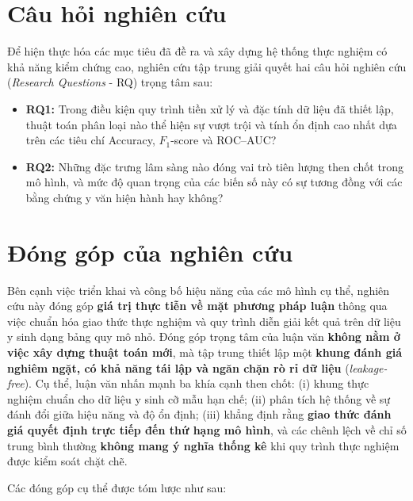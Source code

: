 \documentclass[14pt,a4paper]{extreport}
\begin{document}
\section{Câu hỏi nghiên cứu}

Để hiện thực hóa các mục tiêu đã đề ra và xây dựng hệ thống thực nghiệm có khả năng kiểm chứng cao, nghiên cứu tập trung giải quyết hai câu hỏi nghiên cứu (\textit{Research Questions} - RQ) trọng tâm sau:

\begin{itemize}
  \item \textbf{RQ1:} Trong điều kiện quy trình tiền xử lý và đặc tính dữ liệu đã thiết lập, thuật toán phân loại nào thể hiện sự vượt trội và tính ổn định cao nhất dựa trên các tiêu chí Accuracy, $F_1$-score và ROC--AUC?
  \item \textbf{RQ2:} Những đặc trưng lâm sàng nào đóng vai trò tiên lượng then chốt trong mô hình, và mức độ quan trọng của các biến số này có sự tương đồng với các bằng chứng y văn hiện hành hay không?
\end{itemize}


\section{Đóng góp của nghiên cứu}

Bên cạnh việc triển khai và công bố hiệu năng của các mô hình cụ thể, nghiên cứu này đóng góp \textbf{giá trị thực tiễn về mặt phương pháp luận} thông qua việc chuẩn hóa giao thức thực nghiệm và quy trình diễn giải kết quả trên dữ liệu y sinh dạng bảng quy mô nhỏ. Đóng góp trọng tâm của luận văn \textbf{không nằm ở việc xây dựng thuật toán mới}, mà tập trung thiết lập một \textbf{khung đánh giá nghiêm ngặt, có khả năng tái lập và ngăn chặn rò rỉ dữ liệu} (\textit{leakage-free}). Cụ thể, luận văn nhấn mạnh ba khía cạnh then chốt: (i) khung thực nghiệm chuẩn cho dữ liệu y sinh cỡ mẫu hạn chế; (ii) phân tích hệ thống về sự đánh đổi giữa hiệu năng và độ ổn định; (iii) khẳng định rằng \textbf{giao thức đánh giá quyết định trực tiếp đến thứ hạng mô hình}, và các chênh lệch về chỉ số trung bình thường \textbf{không mang ý nghĩa thống kê} khi quy trình thực nghiệm được kiểm soát chặt chẽ.

Các đóng góp cụ thể được tóm lược như sau:
\end{document}
